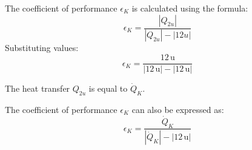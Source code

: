 The coefficient of performance \( \epsilon_K \) is calculated using the formula:  
\[
\epsilon_K = \frac{|Q_{2u}|}{|Q_{2u}| - |12u|}
\]  
Substituting values:  
\[
\epsilon_K = \frac{12 \, \text{u}}{|12 \, \text{u}| - |12 \, \text{u}|}
\]  

The heat transfer \( Q_{2u} \) is equal to \( \dot{Q}_K \).  

The coefficient of performance \( \epsilon_K \) can also be expressed as:  
\[
\epsilon_K = \frac{\dot{Q}_K}{|\dot{Q}_K| - |12 \, \text{u}|}
\]